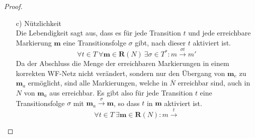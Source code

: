 \documentclass[a4paper]{scrartcl}
\begin{document}
\begin{enumerate}
\begin{proof}
\begin{enumerate}
                \item[c)] Nützlichkeit \\
                    Die Lebendigkeit sagt aus, dass es für jede Transition $t$
                    und jede erreichbare Markierung $\textbf{m}$ eine
                    Transitionsfolge $\sigma$ gibt, nach dieser $t$ aktiviert
                    ist. 
                    \begin{equation}
                        \forall t \in T \ 
                        \forall \textbf{m} \in \textbf{R}(N) \ 
                        \exists \sigma \in T^* :
                        m \stackrel{\sigma t}{\longrightarrow} m'
                    \end{equation}
                    Da der Abschluss die Menge der erreichbaren Markierungen in
                    einem korrekten WF-Netz nicht verändert, sondern nur den
                    Übergang von $\textbf{m}_e$ zu $\textbf{m}_a$ ermöglicht,
                    sind alle Markierungen, welche in $\overline{N}$ erreichbar
                    sind, auch in $N$ von $\textbf{m}_a$ aus erreichbar.
                    Es gibt also für jede Transition $t$ eine Transitionsfolge
                    $\sigma$ mit
                    $\textbf{m}_a \stackrel{\sigma}{\longrightarrow} \textbf{m}$,
                    so dass $t$ in $\textbf{m}$ aktiviert ist.
                    \begin{equation}
                        \forall t \in T \ 
                        \exists \textbf{m} \in \textbf{R}(N) :
                        m \stackrel{t}{\longrightarrow}
                    \end{equation}
                    
            \end{enumerate}
        \end{proof}


\end{enumerate}
\end{document}
